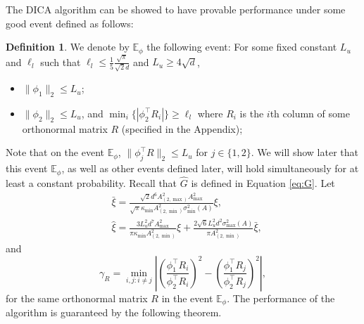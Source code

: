 \documentclass[twoside]{article}
\newcommand{\Ephione}{\mathbb{E}_{\phi_1}}
\newcommand{\Ephitwo}{\mathbb{E}_{\phi_2}}
\newcommand{\Ephi}{\mathbb{E}_{\phi}}
\theoremstyle{definition}
\newtheorem{definition}[lemma]{Definition}
\begin{document}
The DICA algorithm can be showed to have provable performance under some good event defined as follows:
\begin{definition}
We denote by $\Ephi$ the following event:
For some fixed constant $L_u$ and $\ell_l$ such that $\ell_l \le \frac{1}{5}\frac{\sqrt{\pi}}{\sqrt{2}d}$ and $L_u \ge 4\sqrt{d}$,
\begin{itemize}
\item $\|\phi_1\|_2 \le L_u$;
\item $\|\phi_2\|_2 \le L_u$, and $\min_i \{|\phi_2^{\top}R_i|\} \ge \ell_l$ where $R_i$ is the $i$th column of some orthonormal matrix $R$ (specified in the Appendix);
\end{itemize} 
\end{definition}  
Note that on the event $\Ephi$, $\|\phi_j^{\top}R\|_2\le L_u$ for $j\in\{1,2\}$. 
We will show later that this event $\Ephi$, as well as other events defined later, will hold simultaneously for at least a constant probability.
Recall that $\widehat{G}$ is defined in Equation \eqref{eq:G}.
Let 
\begin{align*}
& \bar{\xi} =   \frac{\sqrt{2}d^6A_{(2,\max)}^2A_{\max}^2}{\sqrt{\pi}\kappa_{\min}A^2_{(2,\min)}\sigma_{\min}^2(A)}\xi, \\
& \widehat{\xi} = \frac{3L_u^2d^7A^2_{\max}}{\pi\kappa_{\min}A^2_{(2,\min)}}\xi + \frac{2\sqrt{6}L_u^2d^2\sigma_{\max}^2(A)}{\pi A^2_{(2,\min)}}\bar{\xi},
\end{align*} 
and 
\begin{equation}
\label{def:gammaR}
\gamma_R =  \min_{i,j: i\neq j} \left\vert \left(\frac{\phi_1^{\top}R_i}{\phi_2^{\top}R_i}\right)^2 - \left(\frac{\phi_1^{\top}R_j}{\phi_2^{\top}R_j}\right)^2 \right\vert, 
\end{equation}
for the same orthonormal matrix $R$ in the event $\Ephi$.
The performance of the algorithm is guaranteed by the following theorem.
\end{document}
